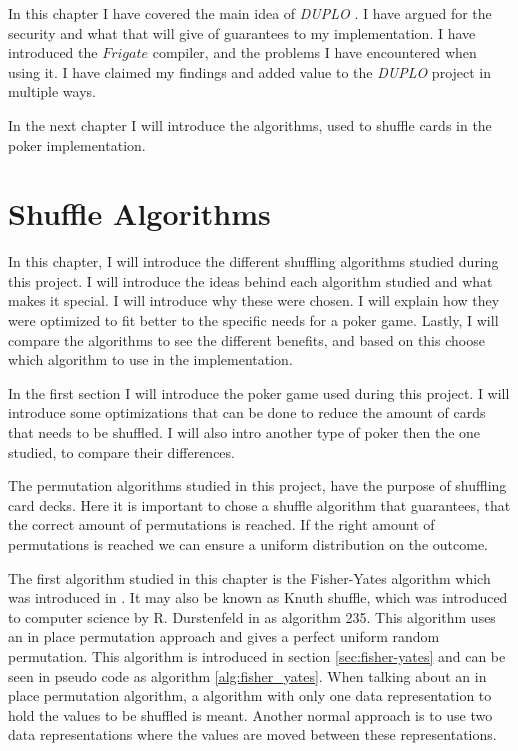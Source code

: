 \documentclass[twoside,11pt,openright]{report}
\newcommand{\DUPLO}{\textit{DUPLO} }
\begin{document}
\bigskip

In this chapter I have covered the main idea of \DUPLO. I have argued for the security and what that will give of guarantees to my implementation. I have introduced the $Frigate$ compiler, and the problems I have encountered when using it. I have claimed my findings and added value to the \DUPLO project in multiple ways.

In the next chapter I will introduce the algorithms, used to shuffle cards in the poker implementation.


\chapter{Shuffle Algorithms}
\label{ch:shuffle}
In this chapter, I will introduce the different shuffling algorithms studied during this project. I will introduce the ideas behind each algorithm studied and what makes it special. I will introduce why these were chosen. I will explain how they were optimized to fit better to the specific needs for a poker game. Lastly, I will compare the algorithms to see the different benefits, and based on this choose which algorithm to use in the implementation.

In the first section I will introduce the poker game used during this project. I will introduce some optimizations that can be done to reduce the amount of cards that needs to be shuffled. I will also intro another type of poker then the one studied, to compare their differences.

The permutation algorithms studied in this project, have the purpose of shuffling card decks. Here it is important to chose a shuffle algorithm that guarantees, that the correct amount of permutations is reached. If the right amount of permutations is reached we can ensure a uniform distribution on the outcome.

The first algorithm studied in this chapter is the Fisher-Yates algorithm which was introduced in \cite{fisher_yates}. It may also be known as Knuth shuffle, which was introduced to computer science by R. Durstenfeld in \cite{durstenfeld} as algorithm 235. This algorithm uses an in place permutation approach and gives a perfect uniform random permutation. This algorithm is introduced in section \ref{sec:fisher-yates} and can be seen in pseudo code as algorithm \ref{alg:fisher_yates}. When talking about an in place permutation algorithm, a algorithm with only one data representation to hold the values to be shuffled is meant. Another normal approach is to use two data representations where the values are moved between these representations.
\end{document}
